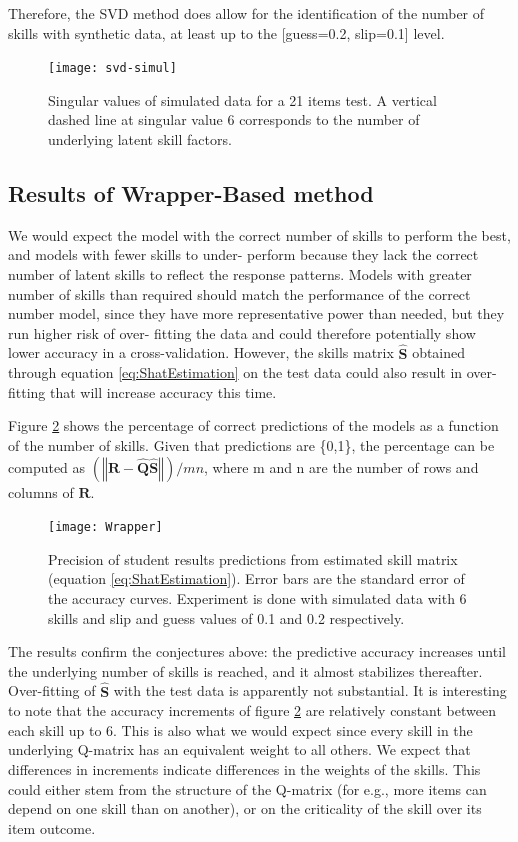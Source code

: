 Therefore, the SVD method does allow for the identification of the number of skills with synthetic data, at least up to the {[}guess=0.2, slip=0.1{]} level.

\begin{figure}
\centering
\texttt{[image: svd-simul]}\caption{Singular values of simulated data for a 21 items test. A vertical
dashed line at singular value 6 corresponds to the number of underlying
latent skill factors.}
\label{SVD-simul}

\end{figure}

\subsection{Results of Wrapper-Based method}


We would expect the model with the correct number of skills to perform the best, and models with fewer skills to under- perform because they lack the correct number of latent skills to reflect the response patterns. Models with greater number of skills than required should match the performance of the correct number model, since they have more representative power than needed, but they run higher risk of over- fitting the data and could therefore potentially show lower accuracy in a cross-validation. However, the skills matrix $\hat{\mathbf{S}}$ obtained through equation \ref{eq:ShatEstimation} on the test data could also result in over-fitting that will increase accuracy this time.

Figure \ref{Wrapper} shows the percentage of correct predictions of the models as a function of the number of skills. Given that predictions are \{0,1\}, the percentage can be computed as $\left(\left\Vert \mathbf{R}-\hat{\mathbf{Q}}\hat{\mathbf{S}}\right\Vert \right)/mn$, where m and n are the number of rows and columns of $\mathbf{R}$.

\begin{figure}
\centering

\texttt{[image: Wrapper]}\caption{Precision of student results predictions from estimated skill matrix
(equation \ref{eq:ShatEstimation}). Error bars are the standard error
of the accuracy curves. Experiment is done with simulated data with
6 skills and slip and guess values of 0.1 and 0.2 respectively.}
\label{Wrapper}
\end{figure}


The results confirm the conjectures above: the predictive accuracy increases until the underlying number of skills is reached, and it almost stabilizes thereafter. Over-fitting of $\hat{\mathbf{S}}$ with the test data is apparently not substantial. It is interesting to note that the accuracy increments of figure \ref{Wrapper} are relatively constant between each skill up to 6. This is also what we would expect since every skill in the underlying Q-matrix has an equivalent weight to all others. We expect that differences in increments indicate differences in the weights of the skills. This could either stem from the structure of the Q-matrix (for e.g., more items can depend on one skill than on another), or on the criticality of the skill over its item outcome.



